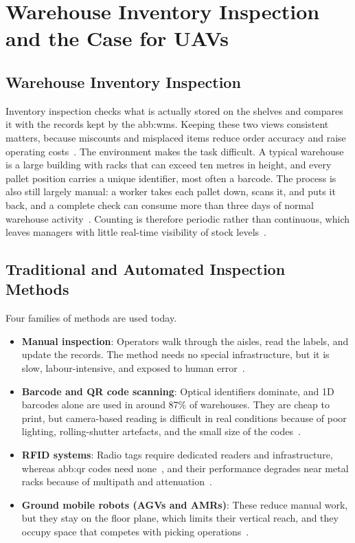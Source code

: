 \section{Warehouse Inventory Inspection and the Case for UAVs}%
\label{sec:bg:inspection}

\subsection{Warehouse Inventory Inspection}%
\label{subsec:bg:inspection-definition}

Inventory inspection checks what is actually stored on the shelves and compares
it with the records kept by the \gls{abb:wms}. Keeping these two views consistent
matters, because miscounts and misplaced items reduce order accuracy and raise
operating costs~\cite{pore2026drone}. The environment makes the task difficult. A
typical warehouse is a large building with racks that can exceed ten metres in
height, and every pallet position carries a unique identifier, most often a
barcode. The process is also still largely manual: a worker takes each pallet
down, scans it, and puts it back, and a complete check can consume more than
three days of normal warehouse activity~\cite{kalinov2020warevision}. Counting is
therefore periodic rather than continuous, which leaves managers with little
real-time visibility of stock levels~\cite{pore2026uavqr}.

\subsection{Traditional and Automated Inspection Methods}%
\label{subsec:bg:inspection-methods}

Four families of methods are used today.

\begin{itemize}[itemsep=0.5em]
    \item \textbf{Manual inspection}: Operators walk through the aisles, read the
          labels, and update the records. The method needs no special
          infrastructure, but it is slow, labour-intensive, and exposed to human
          error~\cite{pore2026uavqr}.
    \item \textbf{Barcode and QR code scanning}: Optical identifiers dominate,
          and 1D barcodes alone are used in around 87\% of warehouses. They are
          cheap to print, but camera-based reading is difficult in real
          conditions because of poor lighting, rolling-shutter artefacts, and the
          small size of the codes~\cite{kalinov2020warevision}.
    \item \textbf{RFID systems}: Radio tags require dedicated readers and
          infrastructure, whereas \gls{abb:qr} codes need
          none~\cite{pore2026uavqr}, and their performance degrades near metal
          racks because of multipath and attenuation~\cite{pore2026drone}.
    \item \textbf{Ground mobile robots (AGVs and AMRs)}: These reduce manual
          work, but they stay on the floor plane, which limits their vertical
          reach, and they occupy space that competes with picking
          operations~\cite{pore2026uavqr}.
\end{itemize}

